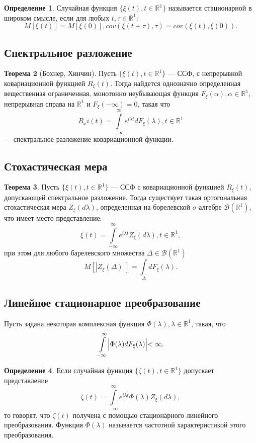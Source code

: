 \documentclass[12pt]{report}
\theoremstyle{definition}
\newtheorem{theorem}{Теорема}[chapter]
\newtheorem{definition}[theorem]{Определение}
\newcommand{\R}{\mathbb R}
\newcommand{\B}{\mathcal B}
\begin{document}
\begin{definition}
Случайная функция $\{\xi(t), t \in \R^1\}$ называется стационарной в широком
смысле, если для любых $t, \tau \in \R^1$:
$$
M[\xi(t)] = M[\xi(0)], cov(\xi(t + \tau), \tau) = cov(\xi(t), \xi(0)).
$$
\end{definition}

\subsection{Спектральное разложение}
\begin{theorem}[Бохнер, Хинчин]
Пусть $\{ \xi(t), t \in \R^1 \}$ --- ССФ, с непрерывной ковариационной функцией
$R_{\xi}(t)$. Тогда найдется однозначно определенная вещественная ограниченная,
монотонно неубывающая функция $F_\xi(\alpha), \alpha \in \R^1$, непрерывная справа
на $\R^1$ и $F_\xi(-\infty) = 0$, такая что
$$
R_xi(t) = \int\limits_{-\infty}^{\infty} e^{i \lambda t} d F_\xi(\lambda), t \in \R^1
$$ --- спектральное разложение ковариационной функции.
\end{theorem}

\subsection{Стохастическая мера}
\begin{theorem}
Пусть $\{ \xi(t), t \in \R^1 \}$ --- ССФ с ковариационной функцией
$R_\xi(t)$, допускающей спектральное разложение. Тогда существует такая
ортогональная стохастическая мера $Z_\xi(d\lambda)$, определенная на
борелевской $\sigma$-алгебре $\B(\R^1)$, что имеет место представление:
$$
\xi(t) = \int\limits_{-\infty}^{\infty} e^{i \lambda t} Z_\xi(d \lambda), t \in \R^1,
$$
при этом для любого барелевского множества $\Delta \in \B(\R^1)$
$$
M[|Z_\xi(\Delta)| ] = \int\limits_{\Delta} d F_{\xi}(\lambda).
$$
\end{theorem}

\subsection{Линейное стационарное преобразование}

Пусть задана некоторая комплексная функция $\Phi(\lambda), \lambda \in \R^1$,
такая, что
$$
\int\limits_{-\infty}^{\infty} \Bigl| \Phi(\lambda) d F_\xi(\lambda) \Bigl| < \infty.
$$

\begin{definition}
Если случайная функция $\{\zeta(t), t \in \R^1 \}$ допускает представление
$$
\zeta(t) = \int\limits_{-\infty}^{\infty} e^{i \lambda t} \Phi(\lambda) Z_\xi(d\lambda),
$$
то говорят, что $\zeta(t)$ получена с помощью стационарного линейного преобразования.
Функция $\Phi(\lambda)$ называется частотной характеристикой этого преобразования.
\end{definition}
\end{document}
